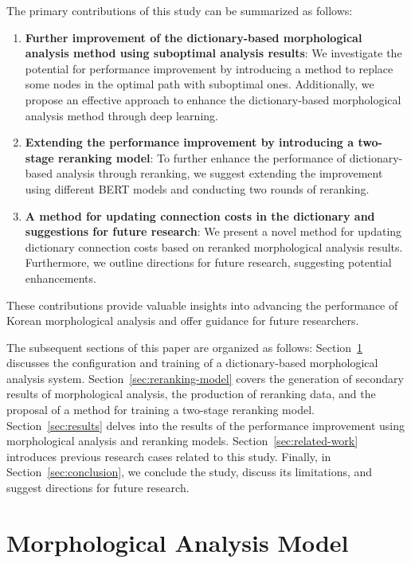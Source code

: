\documentclass[AMS,STIX2COL]{WileyNJD-v2}
\begin{document}
    The primary contributions of this study can be summarized as follows:
    \begin{enumerate}
        \item \textbf{Further improvement of the dictionary-based morphological analysis method using suboptimal analysis results}: We investigate the potential for performance improvement by introducing a method to replace some nodes in the optimal path with suboptimal ones. Additionally, we propose an effective approach to enhance the dictionary-based morphological analysis method through deep learning.
        \item \textbf{Extending the performance improvement by introducing a two-stage reranking model}: To further enhance the performance of dictionary-based analysis through reranking, we suggest extending the improvement using different BERT models and conducting two rounds of reranking.
        \item \textbf{A method for updating connection costs in the dictionary and suggestions for future research}: We present a novel method for updating dictionary connection costs based on reranked morphological analysis results. Furthermore, we outline directions for future research, suggesting potential enhancements.
    \end{enumerate}
    These contributions provide valuable insights into advancing the performance of Korean morphological analysis and offer guidance for future researchers.

    The subsequent sections of this paper are organized as follows:
    Section~\ref{sec:morphological-analysis-model} discusses the configuration and training of a dictionary-based morphological analysis system.
    Section~\ref{sec:reranking-model} covers the generation of secondary results of morphological analysis, the production of reranking data, and the proposal of a method for training a two-stage reranking model.
    Section~\ref{sec:results} delves into the results of the performance improvement using morphological analysis and reranking models.
    Section~\ref{sec:related-work} introduces previous research cases related to this study.
    Finally, in Section~\ref{sec:conclusion}, we conclude the study, discuss its limitations, and suggest directions for future research.


    \section{Morphological Analysis Model}\label{sec:morphological-analysis-model}
\end{document}
